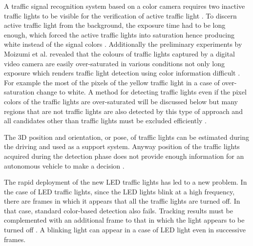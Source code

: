 \documentclass[letterpaper, 10 pt, conference]{ieeeconf} %
\begin{document}
A traffic signal recognition system based on a color camera requires two inactive traffic lights to be visible for the verification of active traffic light \cite{c6}. To discern active traffic light from the background, the exposure time had to be long enough, which forced the active traffic lights into saturation hence producing white instead of the signal colors \cite{c6}. Additionally the preliminary experiments by Moizumi et al. revealed that the colours of traffic lights captured by a digital video camera are easily over-saturated in various conditions not only long exposure which renders traffic light detection using color information difficult \cite{c3}. For example the most of the pixels of the yellow traffic light in a case of over-saturation change to white. A method for detecting traffic lights even if the pixel colors of the traffic lights are over-saturated will be discussed below but many regions that are not traffic lights are also detected by this type of approach and all candidates other than traffic lights must be excluded efficiently \cite{c3}.

The 3D position and orientation, or pose, of traffic lights can be estimated during the driving and used as a support system. Anyway position of the traffic lights acquired during the detection phase does not provide enough information for an autonomous vehicle to make a decision \cite{c7}.

The rapid deployment of the new LED traffic lights has led to a new problem. In the case of LED traffic lights, since the LED lights blink at a high frequency, there are frames in which it appears that all the traffic lights are turned off. In that case, standard color-based detection also fails. Tracking results must be complemented with an additional frame to that in which the light appears to be turned off \cite{c3}. A blinking light can appear in a case of LED light even in successive frames.

\end{document}
